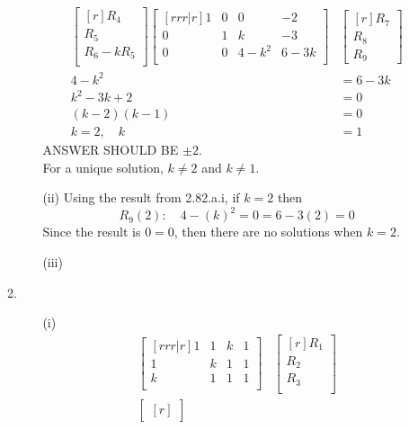\documentclass{report}
\begin{document}
\begin{enumerate}
\begin{enumerate}
\begin{enumerate}
\begin{align*}
		\begin{bmatrix}[r]	
		R_4\\
		R_5\\
		R_6 - kR_5\\	
		\end{bmatrix}
		\begin{bmatrix}[rrr|r]
		1 & 0 & 0 & -2\\
		0 & 1 & k & -3\\
		0 & 0 & 4-k^2 & 6-3k\\
		\end{bmatrix}&
		\begin{bmatrix}[r]
		R_7\\ R_8\\ R_9
		\end{bmatrix}\\		
		4-k^2&= 6-3k\\
		k^2-3k+2&=0\\
		(k-2)(k-1)&=0\\
		k=2, \quad k&=1
		\end{align*}
		ANSWER SHOULD BE $\pm 2$.\\
		For a unique solution, $k \neq 2$ and $k \neq 1$.\\
		\item [(ii)] Using the result from 2.82.a.i, if $k=2$ then
		\[ R_9(2): \quad 4-(k)^2 = 0 = 6-3(2) = 0 \]
		Since the result is $0 = 0$, then there are no solutions when $k=2$.\\
		\item [(iii)] 
		\end{enumerate}	
		\medskip
	\item
	\medskip
		\begin{enumerate}
		\item [(i)]
		\begin{align*}
		\begin{bmatrix}[rrr|r]
		1 & 1 & k & 1\\
		1 & k & 1 & 1\\
		k & 1 & 1 & 1\\
		\end{bmatrix}&
		\begin{bmatrix}[r]
		R_1\\ R_2\\ R_3\\
		\end{bmatrix}\\
		\begin{bmatrix}[r]

\end{bmatrix}
\end{align*}
\end{enumerate}
\end{enumerate}
\end{enumerate}
\end{document}
